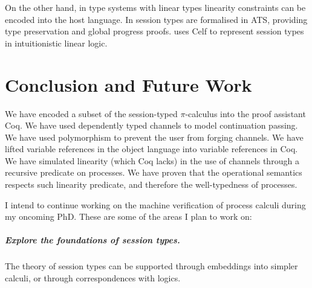 \documentclass{mproj}
\newcommand{\picalc}{$\pi$-calculus}
\begin{document}
On the other hand, in type systems with linear types linearity constraints can be encoded into the host language. In \cite{Xi2016} session types are formalised in ATS, providing type preservation and global progress proofs. \cite{Bock2016} uses Celf to represent session types in intuitionistic linear logic.

\chapter{Conclusion and Future Work}\label{conclusion}

We have encoded a subset of the session-typed \picalc{} into the proof assistant Coq. We have used dependently typed channels to model continuation passing. We have used polymorphism to prevent the user from forging channels. We have lifted variable references in the object language into variable references in Coq. We have simulated linearity (which Coq lacks) in the use of channels through a recursive predicate on processes. We have proven that the operational semantics respects such linearity predicate, and therefore the well-typedness of processes.

I intend to continue working on the machine verification of process calculi during my oncoming PhD. These are some of the areas I plan to work on:

\paragraph{Explore the foundations of session types.} \hfill

The theory of session types can be supported through embeddings into simpler calculi, or through correspondences with logics.
\end{document}
